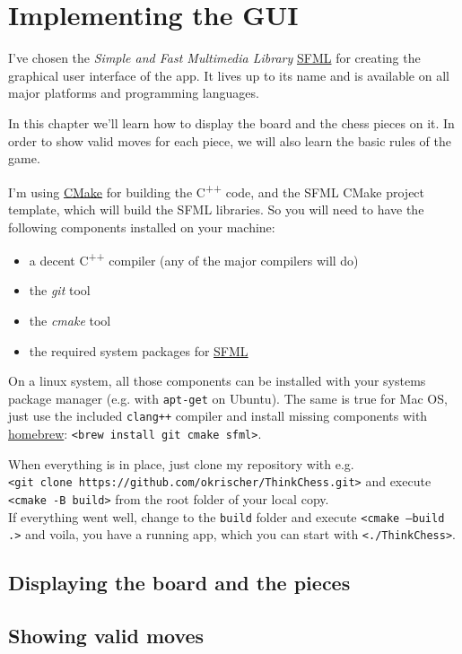 \chapter{Implementing the GUI}

I've chosen the \emph{Simple and Fast Multimedia Library}
\href{https://www.sfml-dev.org/index.php}{SFML} for creating the graphical user interface
of the app.
It lives up to its name and is available on all major platforms and programming languages.

In this chapter we'll learn how to display the board and the chess pieces on it.
In order to show valid moves for each piece, we will also learn the basic rules of the game.

I'm using \href{https://cmake.org/}{CMake} for building the C\textsuperscript{++} code,
and the SFML CMake project template, which will build the SFML libraries.
So you will need to have the following components installed on your machine:

\begin{itemize}
  \item a decent C\textsuperscript{++} compiler (any of the major compilers will do)
  \item the \emph{git} tool
  \item the \emph{cmake} tool
  \item the required system packages for
    \href{https://www.sfml-dev.org/tutorials/2.6/start-cmake.php}{SFML}
\end{itemize}
 
On a linux system, all those components can be installed with your systems package manager
(e.g. with \texttt{apt-get} on Ubuntu).
The same is true for Mac OS, just use the included \texttt{clang++} compiler and install
missing components with \href{https://brew.sh/}{homebrew}:
\texttt{<brew install git cmake sfml>}.

When everything is in place, just clone my repository with e.g.\\
\texttt{<git clone https://github.com/okrischer/ThinkChess.git>} and execute\\
\texttt{<cmake -B build>} from the root folder of your local copy.\\
If everything went well, change to the \texttt{build} folder and execute
\texttt{<cmake --build .>} and voila, you have a running app, which you can start with
\texttt{<./ThinkChess>}.

\section{Displaying the board and the pieces}


\section{Showing valid moves}

